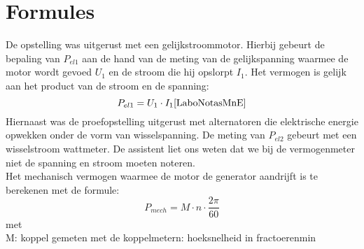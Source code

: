 \section{Formules}
De opstelling was uitgerust met een gelijkstroommotor. Hierbij gebeurt de bepaling van $P_{el1}$
aan de hand van de meting van de gelijkspanning waarmee de motor wordt gevoed $U_1$ en de stroom 
die hij opslorpt $I_1$. Het vermogen is gelijk aan het product van de stroom en de spanning:
\begin{equation}
    P_{el1} = U_1 \cdot I_1
    \cite{LaboNotasMnE}
\end{equation}
Hiernaast was de proefopstelling uitgerust met alternatoren die 
elektrische energie opwekken onder de vorm van wisselspanning. De meting van $P_{el2}$
gebeurt met een wisselstroom wattmeter. De assistent liet ons weten dat we bij de vermogenmeter
niet de spanning en stroom moeten noteren.\\

\noindent Het mechanisch vermogen waarmee de motor de generator aandrijft is te berekenen
met de formule: 
\begin{equation}
    P_{mech} = M \cdot n \cdot \frac{2\pi}{60}
\end{equation} 
met \\
M: koppel gemeten met de koppelmetern: hoeksnelheid in frac{toeren}{min}
